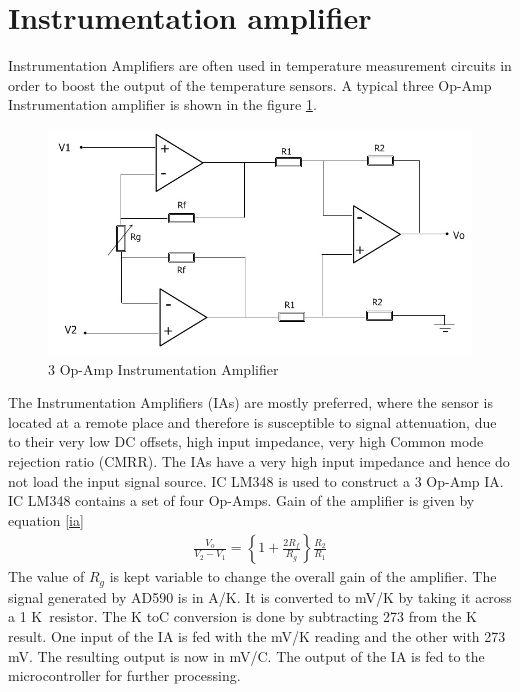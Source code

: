 \documentclass[12pt]{report}
\begin{document}
\section{Instrumentation amplifier}
Instrumentation Amplifiers are often used in temperature measurement circuits in order to boost the output of the temperature sensors. A typical three Op-Amp Instrumentation amplifier is shown in the figure \ref{instramp}.
\begin{figure}
\centering
\includegraphics[width=0.6\linewidth]{Inst_Amp}
\caption{3 Op-Amp Instrumentation Amplifier}
\label{instramp}
\end{figure}
The Instrumentation Amplifiers (IAs) are mostly preferred, where the sensor is located at a remote place and therefore is susceptible to signal attenuation, due to their very low DC offsets, high input impedance, very high Common mode rejection ratio (CMRR). The IAs have a very high input impedance and hence do not load the input signal source. IC LM348 is used to construct a 3 Op-Amp IA. IC LM348 contains a set of four Op-Amps. Gain of the amplifier is given by equation \ref{ia}
\begin{align}
\frac{V_o}{V_2-V_1}=\left\{1+\frac{2R_f}{R_g}\right\}\frac{R_2}{R_1}
\label{ia}
\end{align} 
The value of $R_g$ is kept variable to change the overall gain of the amplifier.
The signal generated by AD590 is in \textmu A/\textdegree K.  It is converted to mV/\textdegree K by taking it across a 1 K\textohm \, resistor. The  \textdegree K to\textdegree C conversion is done by subtracting 273 from the \textdegree K result. One input of the IA is fed with the mV/\textdegree K reading and the other with 273 mV. The resulting output is now in mV/\textdegree C. The output of the IA is fed to the microcontroller for further processing.
\end{document}
